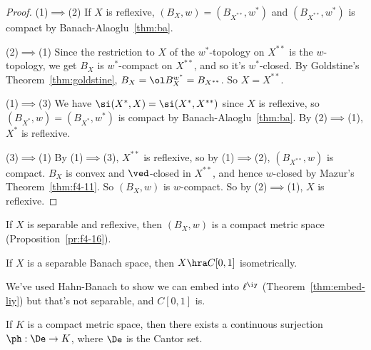\begin{proof}
(1)$\implies $(2) If $X$ is reflexive, $(B_X,w)=(B_{X^{**}},w^*)$ and $(B_{X^{**}},w^*)$ is compact by Banach-Alaoglu~\ref{thm:ba}.

(2)$\implies$(1) Since the restriction to $X$ of the $w^*$-topology on $X^{**}$ is the $w$-topology, we get $B_X$ is $w^*$-compact on $X^{**}$, and so it's $w^*$-closed. By Goldstine's Theorem~\ref{thm:goldstine}, $B_X=\ol B_X^{w^{*}}=B_{X^{**}}$. So $X=X^{**}$.

(1)$\implies$(3) We have $\si(X^*,X)=\si(X^*, X^{**})$ since $X$ is reflexive, so $(B_{X^*},w)=(B_{X^*},w^*)$ is compact by Banach-Alaoglu~\ref{thm:ba}. By (2)$\implies$(1), $X^*$ is reflexive.

(3)$\implies$(1) By (1)$\implies$(3), $X^{**}$ is reflexive, so by (1)$\implies$(2), $(B_{X^{**}},w)$ is compact. $B_X$ is convex and $\ved$-closed in $X^{**}$, and hence $w$-closed by Mazur's Theorem~\ref{thm:f4-11}. So $(B_X,w)$ is $w$-compact. So by (2)$\implies $(1), $X$ is reflexive.
\end{proof}
\begin{rem}
If $X$ is separable and reflexive, then $(B_X, w)$ is a compact metric space (Proposition~\ref{pr:f4-16}).
\end{rem}
\begin{thm}
If $X$ is a separable Banach space, then $X\hra C[0,1]$ isometrically.
\end{thm}
We've used Hahn-Banach to show we can embed into $\ell^{\iy}$ (Theorem~\ref{thm:embed-liy}) but that's not separable, and $C[0,1]$ is.
\begin{lem}
If $K$ is a compact metric space, then there exists a continuous surjection $\ph:\De\to K$, where $\De$ is the Cantor set. 
\end{lem}
